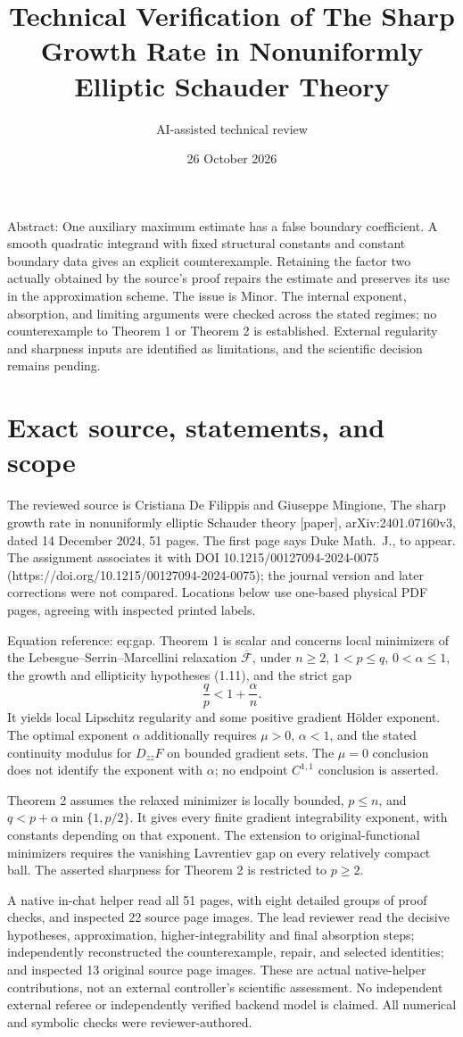 \documentclass[10pt]{article}
\title{Technical Verification of
The Sharp Growth Rate in
Nonuniformly Elliptic Schauder Theory}
\author{AI-assisted technical review}
\date{26 October 2026}
\begin{document}
\maketitle
Abstract: One auxiliary maximum estimate has a false boundary coefficient. A smooth quadratic integrand with fixed structural constants and constant boundary data gives an explicit counterexample. Retaining the factor two actually obtained by the source’s proof repairs the estimate and preserves its use in the approximation scheme. The issue is Minor. The internal exponent, absorption, and limiting arguments were checked across the stated regimes; no counterexample to Theorem 1 or Theorem 2 is established. External regularity and sharpness inputs are identified as limitations, and the scientific decision remains pending.\par
\section*{Exact source, statements, and scope}
The reviewed source is Cristiana De Filippis and Giuseppe Mingione, The sharp growth rate in nonuniformly elliptic Schauder theory [paper], arXiv:2401.07160v3, dated 14 December 2024, 51 pages. The first page says Duke Math. J., to appear. The assignment associates it with DOI 10.1215/00127094-2024-0075 (https://doi.org/10.1215/00127094-2024-0075); the journal version and later corrections were not compared. Locations below use one-based physical PDF pages, agreeing with inspected printed labels.\par
Equation reference: eq:gap. Theorem 1 is scalar and concerns local minimizers of the Lebesgue–Serrin–Marcellini relaxation \(\overline{\mathcal F}\), under \(n\geq2\), \(1<p\leq q\), \(0<\alpha\leq1\), the growth and ellipticity hypotheses (1.11), and the strict gap \[
 \frac qp<1+\frac{\alpha}{n}.\] It yields local Lipschitz regularity and some positive gradient Hölder exponent. The optimal exponent \(\alpha\) additionally requires \(\mu>0\), \(\alpha<1\), and the stated continuity modulus for \(D_{zz}F\) on bounded gradient sets. The \(\mu=0\) conclusion does not identify the exponent with \(\alpha\); no endpoint \(C^{1,1}\) conclusion is asserted.\par
Theorem 2 assumes the relaxed minimizer is locally bounded, \(p\leq n\), and \(q<p+\alpha\min\{1,p/2\}\). It gives every finite gradient integrability exponent, with constants depending on that exponent. The extension to original-functional minimizers requires the vanishing Lavrentiev gap on every relatively compact ball. The asserted sharpness for Theorem 2 is restricted to \(p\geq2\).\par
A native in-chat helper read all 51 pages, with eight detailed groups of proof checks, and inspected 22 source page images. The lead reviewer read the decisive hypotheses, approximation, higher-integrability and final absorption steps; independently reconstructed the counterexample, repair, and selected identities; and inspected 13 original source page images. These are actual native-helper contributions, not an external controller’s scientific assessment. No independent external referee or independently verified backend model is claimed. All numerical and symbolic checks were reviewer-authored.\par
\end{document}
